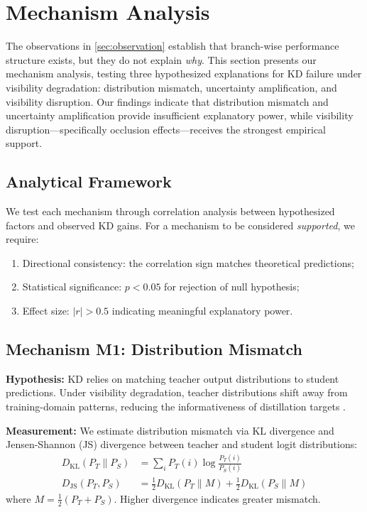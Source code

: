 \section{Mechanism Analysis}
\label{sec:mechanism}

The observations in \cref{sec:observation} establish that branch-wise performance structure exists, but they do not explain \emph{why}. This section presents our mechanism analysis, testing three hypothesized explanations for KD failure under visibility degradation: distribution mismatch, uncertainty amplification, and visibility disruption. Our findings indicate that distribution mismatch and uncertainty amplification provide insufficient explanatory power, while visibility disruption---specifically occlusion effects---receives the strongest empirical support.

\subsection{Analytical Framework}

We test each mechanism through correlation analysis between hypothesized factors and observed KD gains. For a mechanism to be considered \emph{supported}, we require:
\begin{enumerate}
    \item Directional consistency: the correlation sign matches theoretical predictions;
    \item Statistical significance: $p < 0.05$ for rejection of null hypothesis;
    \item Effect size: $|r| > 0.5$ indicating meaningful explanatory power.
\end{enumerate}

\subsection{Mechanism M1: Distribution Mismatch}

\textbf{Hypothesis:} KD relies on matching teacher output distributions to student predictions. Under visibility degradation, teacher distributions shift away from training-domain patterns, reducing the informativeness of distillation targets \cite{wang2020cross}.

\textbf{Measurement:} We estimate distribution mismatch via KL divergence and Jensen-Shannon (JS) divergence between teacher and student logit distributions:
\begin{align}
D_{\text{KL}}(P_T \| P_S) &= \sum_i P_T(i) \log \frac{P_T(i)}{P_S(i)} \\
D_{\text{JS}}(P_T, P_S) &= \frac{1}{2} D_{\text{KL}}(P_T \| M) + \frac{1}{2} D_{\text{KL}}(P_S \| M)
\end{align}
where $M = \frac{1}{2}(P_T + P_S)$. Higher divergence indicates greater mismatch.

